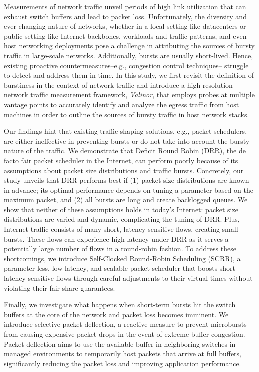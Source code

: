 

Measurements of network traffic unveil periods of high link utilization that can exhaust switch buffers and lead to packet loss. Unfortunately, the diversity and ever-changing nature of networks, whether in a local setting like datacenters or public setting like Internet backbones, workloads and traffic patterns, and even host networking deployments pose a challenge in attributing the sources of bursty traffic in large-scale networks. Additionally, bursts are usually short-lived. Hence, existing proactive countermeasures--e.g., congestion control techniques-- struggle to detect and address them in time. In this study, we first revisit the definition of burstiness in the context of network traffic and introduce a high-resolution network traffic measurement framework, \textit{Valinor},  that employs probes at multiple vantage points to accurately identify and analyze the egress traffic from host machines in order to outline the sources of bursty traffic in host network stacks.

Our findings hint that existing traffic shaping solutions, e.g., packet schedulers, are either ineffective in preventing bursts or do not take into account the bursty nature of the traffic. We demonstrate that Deficit Round Robin (DRR), the de facto fair packet scheduler in the Internet, can perform poorly because of its assumptions about packet size distributions and traffic bursts. Concretely, our study unveils that DRR performs best if (1) packet size distributions are known in advance; its optimal performance depends on tuning a parameter based on the maximum packet, and (2) all bursts are long and create backlogged queues. 
We show that neither of these assumptions holds in today's Internet: packet size distributions are varied and dynamic, complicating the tuning of DRR. Plus, Internet traffic consists of many short, latency-sensitive flows, creating small bursts. These flows can experience high latency under DRR as it serves a potentially large number of flows in a round-robin fashion.
To address these shortcomings, we introduce Self-Clocked Round-Robin Scheduling (SCRR), a parameter-less, low-latency, and scalable packet scheduler that boosts short latency-sensitive flows through careful adjustments to their virtual times without violating their fair share guarantees. 

Finally, we investigate what happens when short-term bursts hit the switch buffers at the core of the network and packet loss becomes imminent. We introduce selective packet deflection, a reactive measure to prevent microbursts from causing expensive packet drops in the event of extreme buffer congestion. Packet deflection aims to use the available buffer in neighboring switches in managed environments to temporarily host packets that arrive at full buffers, significantly reducing the packet loss and improving application performance.

